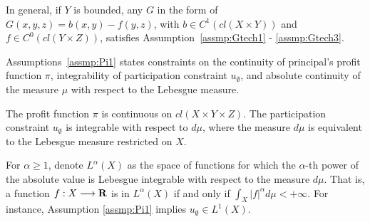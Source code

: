 In general, if $Y$ is bounded, any $G$ in the form of $G(x,y,z) = b(x,y) - f(y,z)$, with $b \in C^1(cl(X\times Y))$ and $f\in C^0(cl(Y \times Z))$, satisfies Assumption~\ref{assmp:Gtech1} - \ref{assmp:Gtech3}.\medskip



Assumptions~\ref{assmp:Pi1} states constraints on the continuity of principal's profit function $\pi$, integrability of participation constraint $u_{\emptyset}$, and absolute continuity of the measure $\mu$ with respect to the Lebesgue measure. 


\begin{assumption}\label{assmp:Pi1}
	The profit function $\pi$ is continuous on $cl(X\times Y\times Z)$. The participation constraint $u_{\emptyset}$ is integrable with respect to $d \mu$, where the measure $d \mu$ is equivalent to the Lebesgue measure restricted on $X$.
\end{assumption}





For $\alpha \ge 1$, denote $L^{\alpha}(X)$ as the space of functions for which the $\alpha$-th power of the absolute value is Lebesgue integrable {with respect to the measure $d \mu$}. That is, a function $f: X\longrightarrow {\mathbf R}$ is in $L^{\alpha}(X)$ if and only if $\int_{X} |f|^{\alpha} d\mu <+\infty$. For instance, Assumption \ref{assmp:Pi1} implies $u_{\emptyset}\in L^{1}(X)$.\medskip








